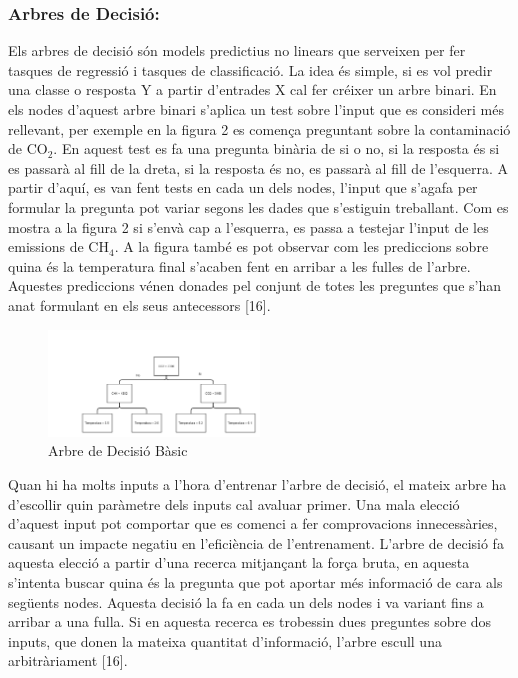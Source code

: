 \documentclass[10pt,a4paper,twocolumn,twoside]{article}
\begin{document}
\subsubsection{Arbres de Decisió:} Els arbres de decisió són models predictius no linears que serveixen per fer tasques de regressió i tasques de classificació. La idea és simple, si es vol predir una classe o resposta Y a partir d'entrades X cal fer créixer un arbre binari. En els nodes d'aquest arbre binari s'aplica un test sobre l'input que es consideri més rellevant, per exemple en la figura 2 es comença preguntant sobre la contaminació de CO$_2$. En aquest test es fa una pregunta binària de si o no, si la resposta és si es passarà al fill de la dreta, si la resposta és no, es passarà al fill de l'esquerra. A partir d'aquí, es van fent tests en cada un dels nodes, l'input que s'agafa per formular la pregunta pot variar segons les dades que s'estiguin treballant. Com es mostra a la figura 2 si s'envà cap a l'esquerra, es passa a testejar l'input de les emissions de CH$_4$. A la figura també es pot observar com les prediccions sobre quina és la temperatura final s'acaben fent en arribar a les fulles de l'arbre. Aquestes prediccions vénen donades pel conjunt de totes les preguntes que s'han anat formulant en els seus antecessors [16].
\begin{figure}[!h]
\centering
	\includegraphics[width=0.5\textwidth]{../img/arbreDecisioSimple}
	\caption{Arbre de Decisió Bàsic}
	\label{fig-DecisionTree}
\end{figure}

Quan hi ha molts inputs a l'hora d'entrenar l'arbre de decisió, el mateix arbre ha d'escollir quin paràmetre dels inputs cal avaluar primer. Una mala elecció d'aquest input pot comportar que es comenci a fer comprovacions innecessàries, causant un impacte negatiu en l'eficiència de l'entrenament. L'arbre de decisió fa aquesta elecció a partir d'una recerca mitjançant la força bruta, en aquesta s'intenta buscar quina és la pregunta que pot aportar més informació de cara als següents nodes. Aquesta decisió la fa en cada un dels nodes i va variant fins a arribar a una fulla. Si en aquesta recerca es trobessin dues preguntes sobre dos inputs, que donen la mateixa quantitat d'informació, l'arbre escull una arbitràriament [16].
\end{document}
